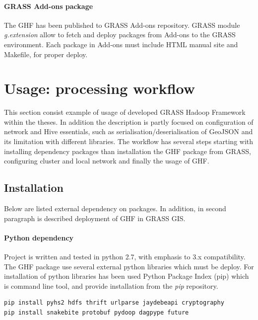 \documentclass[a4paper,12pt,oneside]{report}
\begin{document}
\paragraph{GRASS Add-ons package} The GHF has been published to GRASS Add-ons repository. GRASS module \textit{g.extension} allow to fetch and deploy packages from Add-ons to the GRASS environment. Each package in Add-ons must include HTML manual site and Makefile, for proper deploy. 



\section{Usage: processing workflow}\label{sec:usage_spatial}
This section consist example of usage of developed GRASS Hadoop Framework within the theses. In addition the description is partly focused on configuration of network and Hive essentials, such as serialisation/deserialisation of GeoJSON and its limitation with different libraries. The workflow has several steps starting with installing dependency packages than installation the GHF package from GRASS, configuring cluster and local network and finally the usage of GHF.


\subsection{Installation}
Below are listed external dependency on packages. In addition, in second paragraph is described deployment of GHF in GRASS GIS. 
\paragraph{Python dependency}
Project is written and tested in python 2.7, with emphasis to 3.x compatibility. The GHF package use several external python libraries which must be deploy. For installation of python libraries has been used Python Package Index (pip) which is command line tool, and provide installation from the \textit{pip} repository.
\begin{footnotesize}
\begin{lstlisting}[style=python]
pip install pyhs2 hdfs thrift urlparse jaydebeapi cryptography
pip install snakebite protobuf pydoop dagpype future
\end{lstlisting}
\end{footnotesize}
\end{document}
